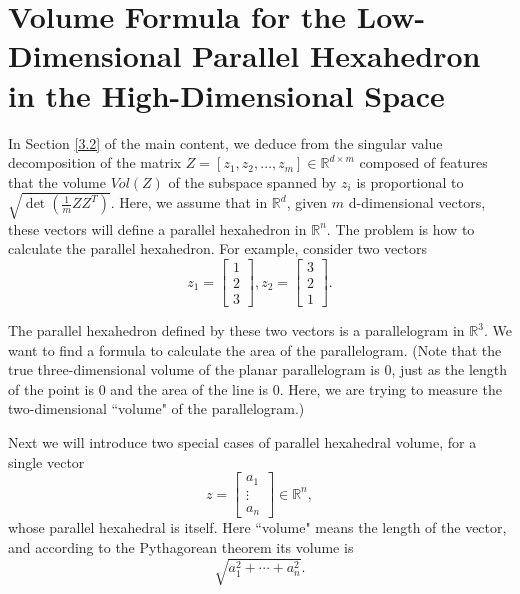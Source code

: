\documentclass[10pt]{article} %
\begin{document}
\section{Volume Formula for the Low-Dimensional Parallel Hexahedron in the High-Dimensional Space\label{E}}
In Section \ref{3.2} of the main content, we deduce from the singular value decomposition of the matrix $Z = \left[ {{z_1},{z_2}, \ldots ,{z_m}} \right] \in {\mathbb{R}^{d \times m}}$ composed of features that the volume $V\!ol( Z )$ of the subspace spanned by $z_i$ is proportional to $\sqrt {\det ( {\frac{1}{m}\!Z\!{Z^T}} )}$. Here, we assume that in $\mathbb{R}^d$, given $m$ d-dimensional vectors, these vectors will define a parallel hexahedron in $\mathbb{R}^n$. The problem is how to calculate the parallel hexahedron. For example, consider two vectors 
\[{z_1} = \left[\! {\begin{array}{*{20}{c}}
1\\
2\\
3
\end{array}} \!\right],{z_2} = \left[\! {\begin{array}{*{20}{c}}
3\\
2\\
1
\end{array}}\! \right].\]

The parallel hexahedron defined by these two vectors is a parallelogram in $\mathbb{R}^3$. We want to find a formula to calculate the area of the parallelogram. (Note that the true three-dimensional volume of the planar parallelogram is 0, just as the length of the point is 0 and the area of the line is 0. Here, we are trying to measure the two-dimensional ``volume" of the parallelogram.)

Next we will introduce two special cases of parallel hexahedral volume, for a single vector \[z = \left[\!\! {\begin{array}{*{20}{c}}
{{a_1}}\\
 \vdots \\
{{a_n}}
\end{array}} \!\!\right] \in {\mathbb{R}^n},\]
whose parallel hexahedral is itself. Here ``volume" means the length of the vector, and according to the Pythagorean theorem its volume is
\begin{equation}
\sqrt {a_1^2 +  \cdots  + a_n^2}. 
\end{equation} 
\end{document}
